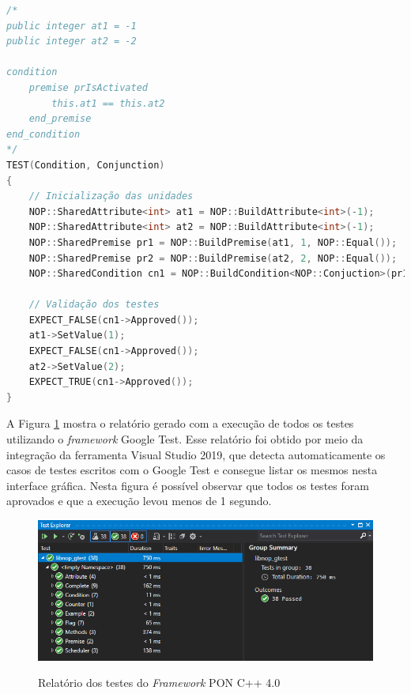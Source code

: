 \begin{lstlisting}[caption = {Caso de teste para \textit{Condition} do \textit{Framework} PON C++ 4.0},
source = {Autoria própria}, float=htb, language=C++,
label = {cod:test_cn},
]
/*
public integer at1 = -1
public integer at2 = -2

condition
    premise prIsActivated
        this.at1 == this.at2
    end_premise
end_condition
*/
TEST(Condition, Conjunction)
{
    // Inicialização das unidades
    NOP::SharedAttribute<int> at1 = NOP::BuildAttribute<int>(-1);
    NOP::SharedAttribute<int> at2 = NOP::BuildAttribute<int>(-1);
    NOP::SharedPremise pr1 = NOP::BuildPremise(at1, 1, NOP::Equal());
    NOP::SharedPremise pr2 = NOP::BuildPremise(at2, 2, NOP::Equal());
    NOP::SharedCondition cn1 = NOP::BuildCondition<NOP::Conjuction>(pr1, pr2);

    // Validação dos testes
    EXPECT_FALSE(cn1->Approved());
    at1->SetValue(1);
    EXPECT_FALSE(cn1->Approved());
    at2->SetValue(2);
    EXPECT_TRUE(cn1->Approved());
}
\end{lstlisting}

\FloatBarrier

A Figura \ref{fig:graph_tests} mostra o relatório gerado com a execução de todos
os testes utilizando o \textit{framework} Google Test. Esse relatório foi obtido
por meio da integração da ferramenta Visual Studio 2019, que detecta
automaticamente os casos de testes escritos com o Google Test e consegue listar
os mesmos nesta interface gráfica. Nesta figura é possível observar que todos os
testes foram aprovados e que a execução levou menos de 1 segundo. 

\begin{figure}[!htb]
\centering
\caption{Relatório dos testes do \textit{Framework} PON C++ 4.0}
\includegraphics[width=\textwidth]{../figures/gtest_020421.png}
\smallskip
{}
\label{fig:graph_tests}
\end{figure}

